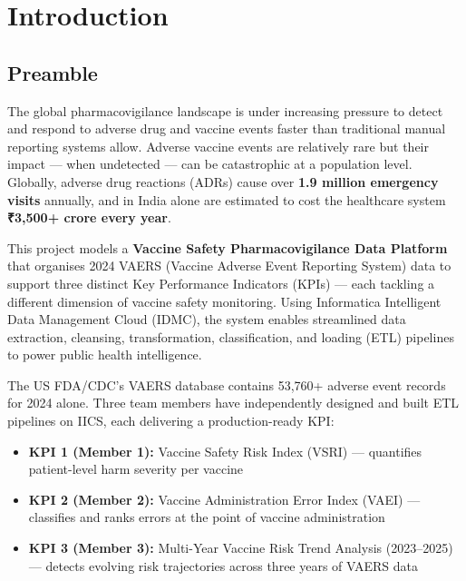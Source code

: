 \documentclass[12pt,a4paper]{report}
\begin{document}
\tableofcontents
\newpage

\chapter{Introduction}

\section{Preamble}

The global pharmacovigilance landscape is under increasing pressure to detect and respond to adverse drug and vaccine events faster than traditional manual reporting systems allow. Adverse vaccine events are relatively rare but their impact — when undetected — can be catastrophic at a population level. Globally, adverse drug reactions (ADRs) cause over \textbf{1.9 million emergency visits} annually, and in India alone are estimated to cost the healthcare system \textbf{₹3,500+ crore every year}.

This project models a \textbf{Vaccine Safety Pharmacovigilance Data Platform} that organises 2024 VAERS (Vaccine Adverse Event Reporting System) data to support three distinct Key Performance Indicators (KPIs) — each tackling a different dimension of vaccine safety monitoring. Using Informatica Intelligent Data Management Cloud (IDMC), the system enables streamlined data extraction, cleansing, transformation, classification, and loading (ETL) pipelines to power public health intelligence.

The US FDA/CDC's VAERS database contains 53,760+ adverse event records for 2024 alone. Three team members have independently designed and built ETL pipelines on IICS, each delivering a production-ready KPI:

\begin{itemize}[leftmargin=*]
  \item \textbf{KPI 1 (Member 1):} Vaccine Safety Risk Index (VSRI) — quantifies patient-level harm severity per vaccine
  \item \textbf{KPI 2 (Member 2):} Vaccine Administration Error Index (VAEI) — classifies and ranks errors at the point of vaccine administration
  \item \textbf{KPI 3 (Member 3):} Multi-Year Vaccine Risk Trend Analysis (2023--2025) — detects evolving risk trajectories across three years of VAERS data
\end{itemize}
\end{document}
